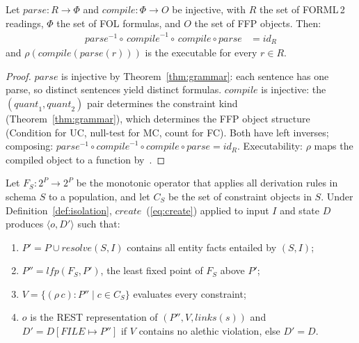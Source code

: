 \documentclass[acmsmall,screen,review]{acmart}
\begin{document}
\begin{theorem}\label{thm:spec}
Let $\mathit{parse}: R \to \Phi$ and $\mathit{compile}: \Phi \to O$ be injective, with $R$ the set of FORML\,2 readings, $\Phi$ the set of FOL formulas, and $O$ the set of FFP objects. Then:
\begin{align}
\mathit{parse}^{-1} \circ\, \mathit{compile}^{-1} \circ\, \mathit{compile} \circ \mathit{parse} &= \mathit{id}_R \label{eq:spec}
\end{align}
and $\rho(\mathit{compile}(\mathit{parse}(r)))$ is the executable for every $r \in R$.
\end{theorem}

\begin{proof}
$\mathit{parse}$ is injective by Theorem~\ref{thm:grammar}: each sentence has one parse, so distinct sentences yield distinct formulas. $\mathit{compile}$ is injective: the $(\mathit{quant}_1, \mathit{quant}_2)$ pair determines the constraint kind (Theorem~\ref{thm:grammar}), which determines the FFP object structure (Condition for UC, null-test for MC, count for FC). Both have left inverses; composing: $\mathit{parse}^{-1} \circ \mathit{compile}^{-1} \circ \mathit{compile} \circ \mathit{parse} = \mathit{id}_R$. Executability: $\rho$ maps the compiled object to a function by~\cite[Sec.\,13.4]{backus78}.
\end{proof}

\begin{theorem}\label{thm:complete}
Let $F_S : 2^P \to 2^P$ be the monotonic operator that applies all derivation rules in schema $S$ to a population, and let $C_S$ be the set of constraint objects in $S$. Under Definition~\ref{def:isolation}, $\mathit{create}$~(\ref{eq:create}) applied to input $I$ and state $D$ produces $\langle o, D'\rangle$ such that:
\begin{enumerate}[nosep]
\item $P' = P \cup \mathit{resolve}(S, I)$ contains all entity facts entailed by $(S, I)$;
\item $P'' = \mathit{lfp}(F_S, P')$, the least fixed point of $F_S$ above $P'$;
\item $V = \{(\rho\,c)\!:\!P'' \mid c \in C_S\}$ evaluates every constraint;
\item $o$ is the REST representation of $(P'', V, \mathit{links}(s))$ and $D' = D[\mathit{FILE} \mapsto P'']$ if $V$ contains no alethic violation, else $D' = D$.
\end{enumerate}
\end{theorem}
\end{document}
